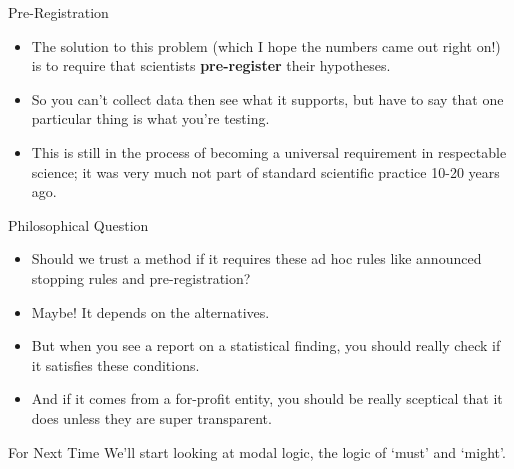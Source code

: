 \documentclass[
  ignorenonframetext,
]{beamer}
\providecommand{\tightlist}{%
  \setlength{\itemsep}{0pt}\setlength{\parskip}{0pt}}
\renewcommand{\,}{\text{, }}
\begin{document}
\begin{frame}{Pre-Registration}
\protect\hypertarget{pre-registration}{}
\begin{itemize}
\tightlist
\item
  The solution to this problem (which I hope the numbers came out right
  on!) is to require that scientists \textbf{pre-register} their
  hypotheses.
\item
  So you can't collect data then see what it supports, but have to say
  that one particular thing is what you're testing.
\item
  This is still in the process of becoming a universal requirement in
  respectable science; it was very much not part of standard scientific
  practice 10-20 years ago.
\end{itemize}
\end{frame}

\begin{frame}{Philosophical Question}
\protect\hypertarget{philosophical-question}{}
\begin{itemize}
\tightlist
\item
  Should we trust a method if it requires these ad hoc rules like
  announced stopping rules and pre-registration? \pause
\item
  Maybe! It depends on the alternatives.
\item
  But when you see a report on a statistical finding, you should really
  check if it satisfies these conditions.
\item
  And if it comes from a for-profit entity, you should be really
  sceptical that it does unless they are super transparent.
\end{itemize}
\end{frame}

\begin{frame}{For Next Time}
\protect\hypertarget{for-next-time}{}
We'll start looking at modal logic, the logic of `must' and `might'.
\end{frame}
\end{document}
